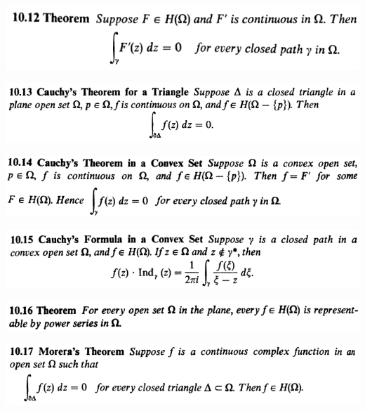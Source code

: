 \documentclass[12pt]{article}
\begin{document}
		\begin{center}
		\includegraphics{10ponto12}
		\end{center}

		\begin{center}
		\includegraphics{10ponto13}
		\end{center}

		\begin{center}
		\includegraphics{10ponto14}
		\end{center}

		\begin{center}
		\includegraphics{10ponto15}
		\end{center}

		\begin{center}
		\includegraphics{10ponto16}
		\end{center}

		\begin{center}
		\includegraphics{10ponto17}
		\end{center}
\end{document}
